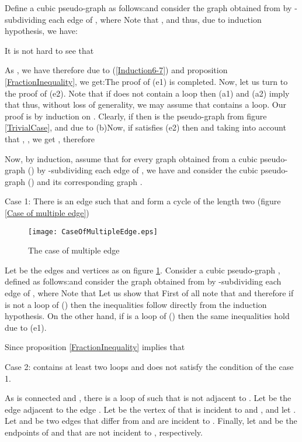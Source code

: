 \documentclass[fleqn,12pt,twoside]{article}
\newenvironment{proof}[1][Proof.]{\begin{trivlist}
\item[\hskip \labelsep {\bfseries #1}]}{\end{trivlist}}
\begin{document}
\begin{proof}
Define a cubic pseudo-graph  as follows:and consider the graph  obtained from  by -subdividing each edge  of , where
Note that ,  and  thus, due to induction hypothesis, we have:

It is not hard to see that

As , we have
therefore due to (\ref{Induction6-7}) and proposition \ref {FractionInequality}, we get:The proof of (e1) is completed. Now, let us turn to the proof of
(e2). Note that if  does not contain a loop then (a1) and
(a2) imply that
thus, without loss of generality, we may assume that 
contains a loop.
Our proof is by induction on . Clearly, if  then  is the pseudo-graph from figure
\ref{TrivialCase},
and due to (b)Now, if  satisfies (e2) then  and taking into
account that , , we get , therefore


Now, by induction, assume that for every graph 
obtained from a cubic pseudo-graph  ()
by -subdividing each edge 
of , we have
and consider the cubic pseudo-graph  () and its
corresponding graph .

Case 1: There is an edge  such that  and  form a cycle of the length two (figure \ref{Case of
multiple edge})

\begin{figure}[h]
\begin{center}
\texttt{[image: CaseOfMultipleEdge.eps]}\\
\caption{The case of multiple edge}\label{Case of multiple edge}
\end{center}
\end{figure}

Let  be the edges and vertices as
on
figure \ref{Case of multiple edge}. Consider a cubic pseudo-graph , defined as follows:and consider the graph  obtained from  by -subdividing each edge  of , where
Note that
Let us show that
First of all note that  and 
therefore if  is not a loop of  () then
the inequalities follow directly from the induction hypothesis. On
the other hand, if  is a loop of  () then
the same inequalities hold due to (e1).

Since
proposition \ref{FractionInequality} implies that


Case 2:  contains at least two loops and does not satisfy the
condition of the case 1.

As  is connected and ,
there is a loop  of  such that  is not adjacent to . Let  be the edge adjacent to the edge . Let  be
the vertex
of  that is incident to  and , and let . Let  and  be two edges that differ from  and are incident to . Finally, let  and  be the endpoints of  and
 that are not incident to , respectively.


\end{proof}
\end{document}
